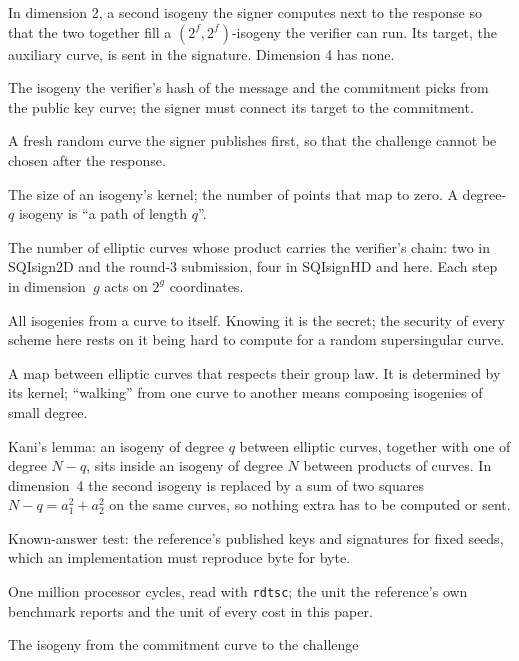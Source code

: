 \documentclass[11pt]{article}
\begin{document}
\begin{description}[style=nextline, leftmargin=1.2em, itemsep=2pt]
\item[auxiliary isogeny] In dimension 2, a second isogeny the signer
  computes next to the response so that the two together fill a
  $(2^f, 2^f)$-isogeny the verifier can run.  Its target, the auxiliary
  curve, is sent in the signature.  Dimension 4 has none.
\item[challenge] The isogeny the verifier's hash of the message and the
  commitment picks from the public key curve; the signer must connect its
  target to the commitment.
\item[commitment] A fresh random curve the signer publishes first, so
  that the challenge cannot be chosen after the response.
\item[degree] The size of an isogeny's kernel; the number of points that
  map to zero.  A degree-$q$ isogeny is ``a path of length $q$''.
\item[dimension (of the embedding)] The number of elliptic curves whose
  product carries the verifier's chain: two in SQIsign2D and the round-3
  submission, four in SQIsignHD and here.  Each step in dimension~$g$ acts
  on $2^g$ coordinates.
\item[endomorphism ring] All isogenies from a curve to itself.  Knowing
  it is the secret; the security of every scheme here rests on it being
  hard to compute for a random supersingular curve.
\item[isogeny] A map between elliptic curves that respects their group
  law.  It is determined by its kernel; ``walking'' from one curve to
  another means composing isogenies of small degree.
\item[Kani embedding] Kani's lemma: an isogeny of degree $q$ between
  elliptic curves, together with one of degree $N - q$, sits inside an
  isogeny of degree $N$ between products of curves.  In dimension~4 the
  second isogeny is replaced by a sum of two squares $N - q = a_1^2 +
  a_2^2$ on the same curves, so nothing extra has to be computed or sent.
\item[KAT] Known-answer test: the reference's published keys and
  signatures for fixed seeds, which an implementation must reproduce byte
  for byte.
\item[megacycle] One million processor cycles, read with \texttt{rdtsc};
  the unit the reference's own benchmark reports and the unit of every
  cost in this paper.
\item[response] The isogeny from the commitment curve to the challenge

\end{description}
\end{document}
